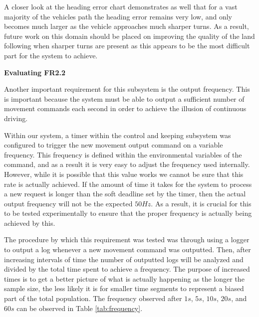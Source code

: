 \documentclass[titlepage,draft]{article}
\begin{document}
{A closer look at the heading error chart demonstrates as well that for a vast majority of the vehicles path the heading error remains very low, and only becomes much larger as the vehicle approaches much sharper turns. As a result, future work on this domain should be placed on improving the quality of the land following when sharper turns are present as this appears to be the most difficult part for the system to achieve.


\textbf{Evaluating FR2.2}

Another important requirement for this subsystem is the output frequency. This is important because the system must be able to output a sufficient number of movement commands each second in order to achieve the illusion of continuous driving.

Within our system, a timer within the control and keeping subsystem was configured to trigger the new movement output command on a variable frequency. This frequency is defined within the environmental variables of the command, and as a result it is very easy to adjust the frequency used internally. However, while it is possible that this value works we cannot be sure that this rate is actually achieved. If the amount of time it takes for the system to process a new request is longer than the soft deadline set by the timer, then the actual output frequency will not be the expected \(50Hz\). As a result, it is crucial for this to be tested experimentally to ensure that the proper frequency is actually being achieved by this.

The procedure by which this requirement was tested was through using a logger to output a log whenever a new movement command was outputted. Then, after increasing intervals of time the number of outputted logs will be analyzed and divided by the total time spent to achieve a frequency. The purpose of increased times is to get a better picture of what is actually happening as the longer the sample size, the less likely it is for smaller time segments to represent a biased part of the total population. The frequency observed after \(1s\), \(5s\), \(10s\), \(20s\), and \(60s\) can be observed in Table \ref{tab:frequency}.

}
\end{document}
